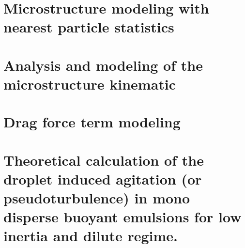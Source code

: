 \documentclass[12pt,a4paper,onehalfspacing]{My_book}
\begin{document}

\chapter{Microstructure modeling with nearest particle statistics}
\localtableofcontents








\chapter{Analysis and modeling of the microstructure kinematic}
\localtableofcontents
















\chapter{Drag force term modeling}
\label{chap:mono-disperse}
\localtableofcontents





\chapter{Theoretical calculation of the droplet induced agitation (or pseudoturbulence) in mono disperse buoyant emulsions for low inertia and dilute regime.}
\localtableofcontents




% 
\end{document}
